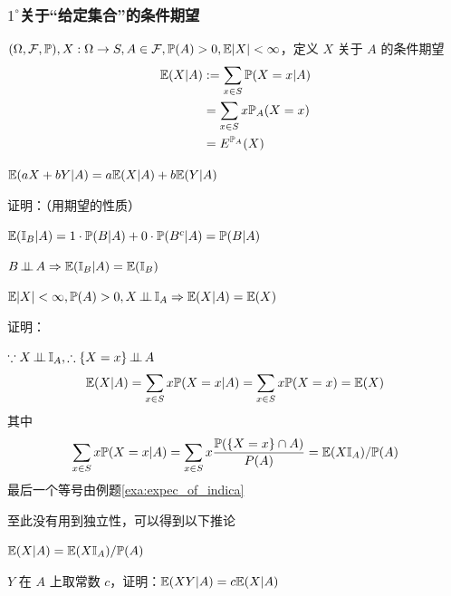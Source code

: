 \subsubsection*{$1^\circ$关于“给定集合”的条件期望}

\begin{definition}\label{def:set_con_exp}
    $(\Omega, \mathcal{F}, \mathbb{P}), X:\Omega\rightarrow S, A\in \mathcal{F}, \mathbb{P}(A)>0, \mathbb E|X|<\infty$，定义 $X$ 关于 $A$ 的条件期望
    \[
    \begin{aligned}
        \mathbb E(X|A)&:=\sum_{x\in S}\mathbb{P}(X=x|A)\\
        &=\sum_{x\in S}x\mathbb{P}_A(X=x)\\
        &=E^{\mathbb{P}_A}(X)
    \end{aligned}
    \]
\end{definition}

\begin{property}[线性性]\label{prop:linearity1}
$\mathbb E(aX+bY|A)=a\mathbb E(X|A)+b\mathbb E(Y|A)$
\end{property}

证明：（用期望的性质）

\begin{example}
    $\mathbb E(\mathbb I_B|A)=1\cdot \mathbb{P}(B|A)+0\cdot \mathbb{P}(B^c|A)=\mathbb{P}(B|A)$
\end{example}

\begin{example}
    $B\operatorname{\perp\!\!\!\perp} A\Rightarrow \mathbb E(\mathbb I_B|A)=\mathbb E(\mathbb I_B)$
\end{example}

\begin{property}
$\mathbb E|X|<\infty, \mathbb{P}(A)>0, X\operatorname{\perp\!\!\!\perp} \mathbb I_A\Rightarrow \mathbb E(X|A)=\mathbb E(X)$
\end{property}

证明：

$\because X\operatorname{\perp\!\!\!\perp} \mathbb I_A, \therefore \{X=x\}\operatorname{\perp\!\!\!\perp} A$
\[
\mathbb E(X|A)=\sum_{x\in S}x\mathbb{P}(X=x|A)=\sum_{x\in S}x\mathbb{P}(X=x)=\mathbb E(X)
\]
其中
\[
\sum_{x\in S}x\mathbb{P}(X=x|A)=\sum_{x\in S}x\frac{\mathbb{P}(\{X=x\}\cap A)}{P(A)}=\mathbb E(X\mathbb I_A)/\mathbb{P}(A)
\]
最后一个等号由例题\ref{exa:expec_of_indica}

至此没有用到独立性，可以得到以下推论

\begin{corollary}\label{cor:con_exp_indic}
    $\mathbb E(X|A)=\mathbb E(X\mathbb I_A)/\mathbb{P}(A)$
\end{corollary}

\begin{problem}[作业2-1]
$Y$ 在 $A$ 上取常数 $c$，证明：$\mathbb E(XY|A)=c\mathbb E(X|A)$
\end{problem}

